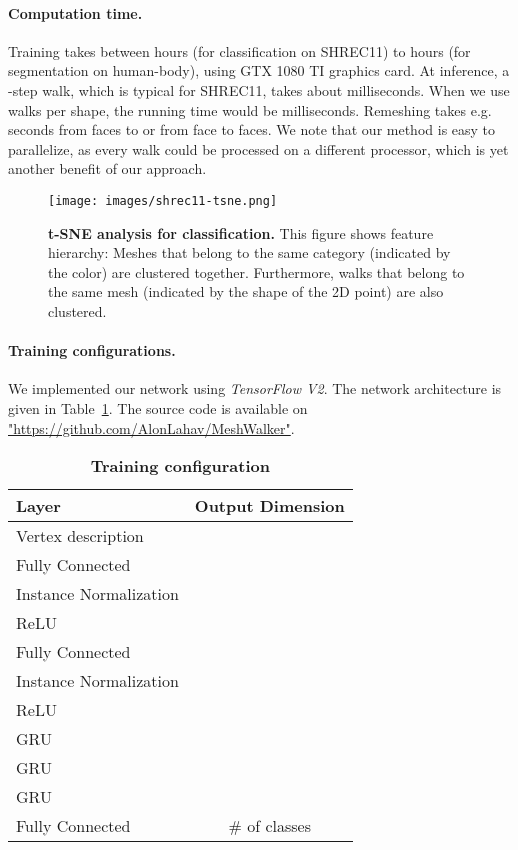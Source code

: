 \documentclass[acmtog]{acmart}
\begin{document}
\paragraph{Computation time.}
Training takes between  hours (for classification on SHREC11) to  hours (for segmentation on human-body), using GTX 1080 TI graphics card.
At inference, a -step walk, which is typical for  SHREC11, takes about  milliseconds.
When we use  walks per shape, the running time would be  milliseconds. 
Remeshing takes e.g.  seconds from  faces to  or  from  face  to  faces.
We note that our method is easy to parallelize, as every walk could be processed on a different processor, which is yet another benefit of our approach.


\begin{figure}[tb] 
\centering 
\texttt{[image: images/shrec11-tsne.png]} 
\caption{
{\bf t-SNE analysis for classification.}
This figure shows feature hierarchy:
Meshes that belong to the same category (indicated by the color) are clustered together.
Furthermore, walks that belong to the same mesh  (indicated by the shape of the 2D point) are also clustered.
}
\label{fig:t-sne_shrec} 
\end{figure}


\paragraph{Training configurations.}
We implemented our network using {\em TensorFlow V2}. 
The network architecture is given in Table~\ref{tbl:configuration}.
The source code is available on
\url{"https://github.com/AlonLahav/MeshWalker"}.

\begin{table}[htb]\caption{{\bf Training configuration}}
\begin{center}
 \begin{tabular}{||l c||} 
 \hline
 Layer & Output Dimension \\ [0.5ex] 
 \hline\hline\hline
 Vertex description &   \\ 
 Fully Connected &   \\ 
 Instance Normalization &  \\ 
 ReLU &  \\
 Fully Connected &   \\ 
 Instance Normalization &  \\ 
 ReLU &  \\
 GRU &  \\
 GRU &  \\
 GRU &  \\
 Fully Connected & \# of classes  \\ 
 \hline
\end{tabular}
\label{tbl:configuration}
\end{center}
\end{table}
\end{document}
